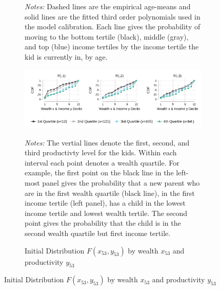 \documentclass[12pt]{article}
\begin{document}
\begin{figure}
\begin{subfigure}{\textwidth}
		{\begin{footnotesize}\textit{Notes:}
			Dashed lines are the empirical age-means and solid lines are the fitted third order polynomials used in the model calibration. Each line gives the probability of moving to the bottom tertile (black), middle (gray), and top (blue) income tertiles by the income tertile the kid is currently in, by age. \end{footnotesize}}
	\end{subfigure}

	
	\begin{subfigure}{\textwidth}
		\caption{Initial Distribution $F(x_{53},y_{53})$ by wealth $x_{53}$ and productivity $y_{53}$}\label{fig:inidistr}
		\includegraphics[width=1\textwidth]{../tabfig/empirical/inidistr} 
		{\begin{footnotesize}\textit{Notes:} The vertial lines denote the first, second, and third productivty level for the kids. Within each interval each point denotes a wealth quartile. For example, the first point on the black line in the left-most panel gives the probability that a new parent who are in the first wealth quartile (black line), in the first income tertile (left panel), has a child in the lowest income tertile and lowest wealth tertile. The second point gives the probability that the child is in the second wealth quartile but first income tertile. \end{footnotesize}}
		\end{subfigure}
\end{figure}
\end{document}
